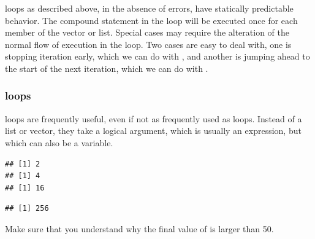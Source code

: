 \documentclass[krantz2]{krantz}\usepackage{knitr}
\begin{document}
\begin{explainbox}
 loops as described above, in the absence of errors, have statically predictable behavior. The compound statement in the loop will be executed once for each member of the vector or list. Special cases may require the alteration of the normal flow of execution in the loop. Two cases are easy to deal with, one is stopping iteration early, which we can do with , and another is jumping ahead to the start of the next iteration, which we can do with .
\end{explainbox}

\subsubsection[\texttt{while} loops]{ loops}
 loops are frequently useful, even if not as frequently used as  loops. Instead of a list or vector, they take a logical argument, which is usually an expression, but which can also be a variable.

\begin{knitrout}\footnotesize
{}\color{fgcolor}\begin{kframe}
\begin{alltt}
 \hlkwb{<-} 
  \hlopt{<} \hlstd{) \{}
   \hlkwb{<-} \hlopt{^}
\hlstd{\}}
\end{alltt}
\begin{verbatim}
## [1] 2
## [1] 4
## [1] 16
\end{verbatim}
\begin{alltt}
\end{alltt}
\begin{verbatim}
## [1] 256
\end{verbatim}
\end{kframe}
\end{knitrout}

\begin{playground}
Make sure that you understand why the final value of  is larger than 50.
\end{playground}
\end{document}
